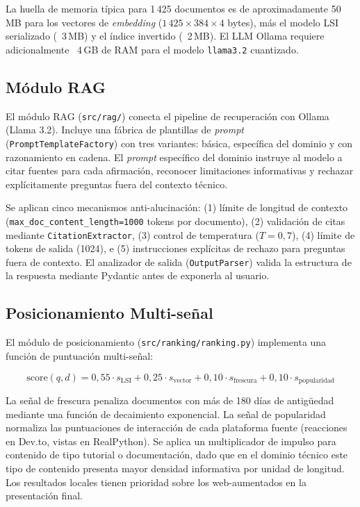 \documentclass[runningheads,a4paper]{llncs}
\begin{document}
La huella de memoria típica para 1\,425 documentos es de aproximadamente 50\,MB para los vectores de \emph{embedding} ($1\,425 \times 384 \times 4$ bytes), más el modelo LSI serializado (~3\,MB) y el índice invertido (~2\,MB). El LLM Ollama requiere adicionalmente ~4\,GB de RAM para el modelo \texttt{llama3.2} cuantizado.

\subsection{Módulo RAG}

El módulo RAG (\texttt{src/rag/}) conecta el pipeline de recuperación con Ollama (Llama 3.2). Incluye una fábrica de plantillas de \emph{prompt} (\texttt{PromptTemplateFactory}) con tres variantes: básica, específica del dominio y con razonamiento en cadena. El \emph{prompt} específico del dominio instruye al modelo a citar fuentes para cada afirmación, reconocer limitaciones informativas y rechazar explícitamente preguntas fuera del contexto técnico.

Se aplican cinco mecanismos anti-alucinación: (1) límite de longitud de contexto (\texttt{max\_doc\_content\_length=1000} tokens por documento), (2) validación de citas mediante \texttt{CitationExtractor}, (3) control de temperatura ($T=0{,}7$), (4) límite de tokens de salida (1024), e (5) instrucciones explícitas de rechazo para preguntas fuera de contexto. El analizador de salida (\texttt{OutputParser}) valida la estructura de la respuesta mediante Pydantic antes de exponerla al usuario.

\subsection{Posicionamiento Multi-señal}

El módulo de posicionamiento (\texttt{src/ranking/ranking.py}) implementa una función de puntuación multi-señal:

$$\text{score}(q, d) = 0{,}55 \cdot s_\text{LSI} + 0{,}25 \cdot s_\text{vector} + 0{,}10 \cdot s_\text{frescura} + 0{,}10 \cdot s_\text{popularidad}$$

La señal de frescura penaliza documentos con más de 180 días de antigüedad mediante una función de decaimiento exponencial. La señal de popularidad normaliza las puntuaciones de interacción de cada plataforma fuente (reacciones en Dev.to, vistas en RealPython). Se aplica un multiplicador de impulso para contenido de tipo tutorial o documentación, dado que en el dominio técnico este tipo de contenido presenta mayor densidad informativa por unidad de longitud. Los resultados locales tienen prioridad sobre los web-aumentados en la presentación final.
\end{document}
